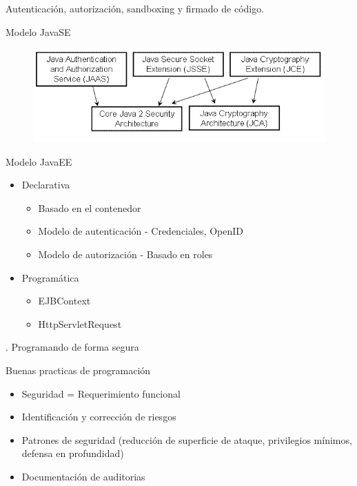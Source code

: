 \documentclass[12pt]{beamer}
\begin{document}
\begin{frame}
\LARGE \centering Autenticación, autorización, sandboxing y firmado de código.
\end{frame}

\begin{frame}{Modelo JavaSE}
\begin{figure}
\centering
\includegraphics[width=\linewidth]{Images/jsesecurity}
\end{figure}
\end{frame}


\begin{frame}{Modelo JavaEE}
\begin{itemize}
\item Declarativa
	\begin{itemize}
	\item Basado en el contenedor
	\item Modelo de autenticación - Credenciales, OpenID
	\item Modelo de autorización - Basado en roles
	\end{itemize}
\item Programática
	\begin{itemize}
	\item EJBContext
	\item HttpServletRequest
	\end{itemize}
\end{itemize}
\end{frame}

\begin{frame}
\LARGE {}. Programando de forma segura
\end{frame}

\begin{frame}{Buenas practicas de programación}
\begin{itemize}
\item Seguridad = Requerimiento funcional
\item Identificación y corrección de riesgos
\item Patrones de seguridad (reducción de superficie de ataque, privilegios mínimos, defensa en profundidad)
\item Documentación de auditorias
\end{itemize}
\end{frame}
\end{document}

